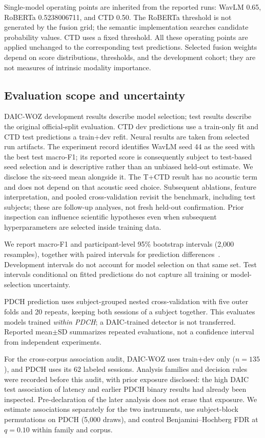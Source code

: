 \documentclass{article}
\begin{document}
Single-model operating points are inherited from the reported runs: WavLM 0.65, RoBERTa 0.5238006711, and CTD 0.50. The RoBERTa threshold is not generated by the fusion grid; the semantic implementation searches candidate probability values. CTD uses a fixed threshold. All these operating points are applied unchanged to the corresponding test predictions. Selected fusion weights depend on score distributions, thresholds, and the development cohort; they are not measures of intrinsic modality importance.

\subsection{Evaluation scope and uncertainty}
DAIC-WOZ development results describe model selection; test results describe the original official-split evaluation. CTD dev predictions use a train-only fit and CTD test predictions a train+dev refit. Neural results are taken from selected run artifacts. The experiment record identifies WavLM seed 44 as the seed with the best test macro-F1; its reported score is consequently subject to test-based seed selection and is descriptive rather than an unbiased held-out estimate. We disclose the six-seed mean alongside it. The T+CTD result has no acoustic term and does not depend on that acoustic seed choice. Subsequent ablations, feature interpretation, and pooled cross-validation revisit the benchmark, including test subjects; these are follow-up analyses, not fresh held-out confirmation. Prior inspection can influence scientific hypotheses even when subsequent hyperparameters are selected inside training data.

We report macro-F1 and participant-level 95\% bootstrap intervals (2,000 resamples), together with paired intervals for prediction differences~\cite{ferrer2024confidence}. Development intervals do not account for model selection on that same set. Test intervals conditional on fitted predictions do not capture all training or model-selection uncertainty.

PDCH prediction uses subject-grouped nested cross-validation with five outer folds and 20 repeats, keeping both sessions of a subject together. This evaluates models trained \emph{within PDCH}; a DAIC-trained detector is not transferred. Reported mean$\pm$SD summarizes repeated evaluations, not a confidence interval from independent experiments.

For the cross-corpus association audit, DAIC-WOZ uses train+dev only ($n=135$), and PDCH uses its 62 labeled sessions. Analysis families and decision rules were recorded before this audit, with prior exposure disclosed: the high DAIC test association of latency and earlier PDCH binary results had already been inspected. Pre-declaration of the later analysis does not erase that exposure. We estimate associations separately for the two instruments, use subject-block permutations on PDCH (5,000 draws), and control Benjamini--Hochberg FDR at $q=0.10$ within family and corpus.
\end{document}
